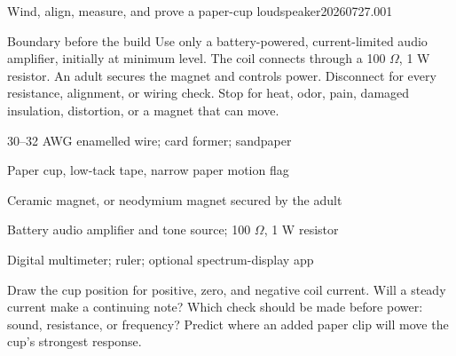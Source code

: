

  {Wind, align, measure, and prove a paper-cup loudspeaker}{20260727.001}


\begin{telospanel}{Boundary before the build}
Use only a battery-powered, current-limited audio amplifier, initially at
minimum level. The coil connects through a 100 \(\Omega\), 1 W resistor. An
adult secures the magnet and controls power. Disconnect for every resistance,
alignment, or wiring check. Stop for heat, odor, pain, damaged insulation,
distortion, or a magnet that can move.
\end{telospanel}

\begin{materials}
\item 30--32 AWG enamelled wire; card former; sandpaper
\item Paper cup, low-tack tape, narrow paper motion flag
\item Ceramic magnet, or neodymium magnet secured by the adult
\item Battery audio amplifier and tone source; 100 \(\Omega\), 1 W resistor
\item Digital multimeter; ruler; optional spectrum-display app
\end{materials}

\begin{predict}
Draw the cup position for positive, zero, and negative coil current. Will a
steady current make a continuing note? Which check should be made before power:
sound, resistance, or frequency? Predict where an added paper clip will move
the cup's strongest response.
\end{predict}

